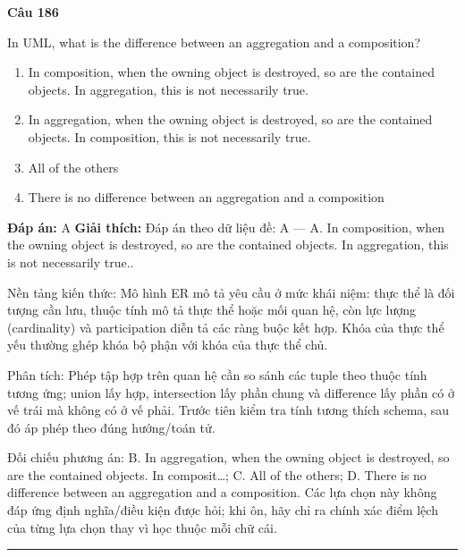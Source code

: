 \documentclass[11pt,a4paper]{article}
\newenvironment{question}[1]{%
  \par\vspace{1em}\noindent\textbf{\large Câu #1}\par\vspace{0.4em}
}{%
  \par\vspace{1em}\hrule\vspace{0.6em}
}
\newenvironment{choices}{%
  \begin{enumerate}[label=\textbf{\Alph*.},leftmargin=2.2em,itemsep=2pt,topsep=3pt]
}{%
  \end{enumerate}
}
\newcommand{\choice}{\item}
\begin{document}
\begin{question}{186}
In UML, what is the difference between an aggregation and a composition?
\begin{choices}
\choice In composition, when the owning object is destroyed, so are the contained objects. In aggregation, this is not necessarily true.
\choice In aggregation, when the owning object is destroyed, so are the contained objects. In composition, this is not necessarily true.
\choice All of the others
\choice There is no difference between an aggregation and a composition
\end{choices}
\textbf{Đáp án:} A
\textbf{Giải thích:} Đáp án theo dữ liệu đề: A — A. In composition, when the owning object is destroyed, so are the contained objects. In aggregation, this is not necessarily true..

Nền tảng kiến thức: Mô hình ER mô tả yêu cầu ở mức khái niệm: thực thể là đối tượng cần lưu, thuộc tính mô tả thực thể hoặc mối quan hệ, còn lực lượng (cardinality) và participation diễn tả các ràng buộc kết hợp. Khóa của thực thể yếu thường ghép khóa bộ phận với khóa của thực thể chủ.

Phân tích: Phép tập hợp trên quan hệ cần so sánh các tuple theo thuộc tính tương ứng; union lấy hợp, intersection lấy phần chung và difference lấy phần có ở vế trái mà không có ở vế phải. Trước tiên kiểm tra tính tương thích schema, sau đó áp phép theo đúng hướng/toán tử.

Đối chiếu phương án: B. In aggregation, when the owning object is destroyed, so are the contained objects. In composit…; C. All of the others; D. There is no difference between an aggregation and a composition. Các lựa chọn này không đáp ứng định nghĩa/điều kiện được hỏi; khi ôn, hãy chỉ ra chính xác điểm lệch của từng lựa chọn thay vì học thuộc mỗi chữ cái.
\end{question}
\end{document}
